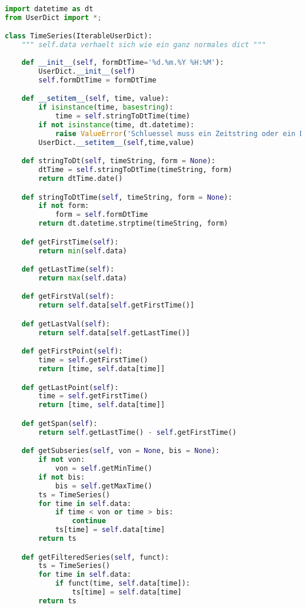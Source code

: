 \begin{lstlisting}[language=python]
import datetime as dt
from UserDict import *;

class TimeSeries(IterableUserDict):
    """ self.data verhaelt sich wie ein ganz normales dict """
    
    def __init__(self, formDtTime='%d.%m.%Y %H:%M'):
        UserDict.__init__(self)
        self.formDtTime = formDtTime

    def __setitem__(self, time, value):
        if isinstance(time, basestring):
            time = self.stringToDtTime(time)
        if not isinstance(time, dt.datetime):
            raise ValueError('Schluessel muss ein Zeitstring oder ein Datetime sein')
        UserDict.__setitem__(self,time,value)

    def stringToDt(self, timeString, form = None):
        dtTime = self.stringToDtTime(timeString, form)
        return dtTime.date()

    def stringToDtTime(self, timeString, form = None):
        if not form:
            form = self.formDtTime
        return dt.datetime.strptime(timeString, form)

    def getFirstTime(self):
        return min(self.data)

    def getLastTime(self):
        return max(self.data)

    def getFirstVal(self):
        return self.data[self.getFirstTime()]

    def getLastVal(self):
        return self.data[self.getLastTime()]

    def getFirstPoint(self):
        time = self.getFirstTime()
        return [time, self.data[time]]

    def getLastPoint(self):
        time = self.getFirstTime()
        return [time, self.data[time]]

    def getSpan(self):
        return self.getLastTime() - self.getFirstTime()

    def getSubseries(self, von = None, bis = None):
        if not von:
            von = self.getMinTime()
        if not bis:
            bis = self.getMaxTime()
        ts = TimeSeries()
        for time in self.data:
            if time < von or time > bis:
                continue
            ts[time] = self.data[time]
        return ts

    def getFilteredSeries(self, funct):
        ts = TimeSeries()
        for time in self.data:
            if funct(time, self.data[time]):
                ts[time] = self.data[time]
        return ts



\end{lstlisting}
